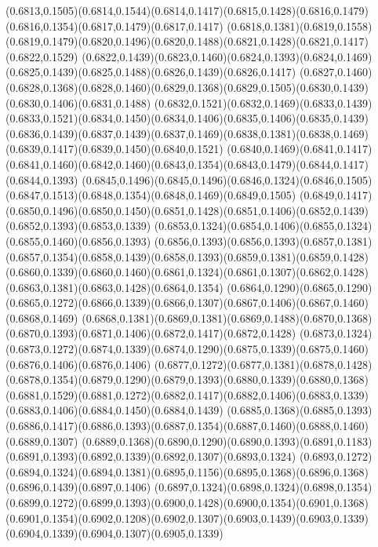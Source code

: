 (0.6813,0.1505)(0.6814,0.1544)(0.6814,0.1417)(0.6815,0.1428)(0.6816,0.1479)(0.6816,0.1354)(0.6817,0.1479)(0.6817,0.1417)
(0.6818,0.1381)(0.6819,0.1558)(0.6819,0.1479)(0.6820,0.1496)(0.6820,0.1488)(0.6821,0.1428)(0.6821,0.1417)(0.6822,0.1529)
(0.6822,0.1439)(0.6823,0.1460)(0.6824,0.1393)(0.6824,0.1469)(0.6825,0.1439)(0.6825,0.1488)(0.6826,0.1439)(0.6826,0.1417)
(0.6827,0.1460)(0.6828,0.1368)(0.6828,0.1460)(0.6829,0.1368)(0.6829,0.1505)(0.6830,0.1439)(0.6830,0.1406)(0.6831,0.1488)
(0.6832,0.1521)(0.6832,0.1469)(0.6833,0.1439)(0.6833,0.1521)(0.6834,0.1450)(0.6834,0.1406)(0.6835,0.1406)(0.6835,0.1439)
(0.6836,0.1439)(0.6837,0.1439)(0.6837,0.1469)(0.6838,0.1381)(0.6838,0.1469)(0.6839,0.1417)(0.6839,0.1450)(0.6840,0.1521)
(0.6840,0.1469)(0.6841,0.1417)(0.6841,0.1460)(0.6842,0.1460)(0.6843,0.1354)(0.6843,0.1479)(0.6844,0.1417)(0.6844,0.1393)
(0.6845,0.1496)(0.6845,0.1496)(0.6846,0.1324)(0.6846,0.1505)(0.6847,0.1513)(0.6848,0.1354)(0.6848,0.1469)(0.6849,0.1505)
(0.6849,0.1417)(0.6850,0.1496)(0.6850,0.1450)(0.6851,0.1428)(0.6851,0.1406)(0.6852,0.1439)(0.6852,0.1393)(0.6853,0.1339)
(0.6853,0.1324)(0.6854,0.1406)(0.6855,0.1324)(0.6855,0.1460)(0.6856,0.1393)
\PST@Solid(0.6856,0.1393)(0.6856,0.1393)(0.6857,0.1381)(0.6857,0.1354)(0.6858,0.1439)(0.6858,0.1393)(0.6859,0.1381)(0.6859,0.1428)
(0.6860,0.1339)(0.6860,0.1460)(0.6861,0.1324)(0.6861,0.1307)(0.6862,0.1428)(0.6863,0.1381)(0.6863,0.1428)(0.6864,0.1354)
(0.6864,0.1290)(0.6865,0.1290)(0.6865,0.1272)(0.6866,0.1339)(0.6866,0.1307)(0.6867,0.1406)(0.6867,0.1460)(0.6868,0.1469)
(0.6868,0.1381)(0.6869,0.1381)(0.6869,0.1488)(0.6870,0.1368)(0.6870,0.1393)(0.6871,0.1406)(0.6872,0.1417)(0.6872,0.1428)
(0.6873,0.1324)(0.6873,0.1272)(0.6874,0.1339)(0.6874,0.1290)(0.6875,0.1339)(0.6875,0.1460)(0.6876,0.1406)(0.6876,0.1406)
(0.6877,0.1272)(0.6877,0.1381)(0.6878,0.1428)(0.6878,0.1354)(0.6879,0.1290)(0.6879,0.1393)(0.6880,0.1339)(0.6880,0.1368)
(0.6881,0.1529)(0.6881,0.1272)(0.6882,0.1417)(0.6882,0.1406)(0.6883,0.1339)(0.6883,0.1406)(0.6884,0.1450)(0.6884,0.1439)
(0.6885,0.1368)(0.6885,0.1393)(0.6886,0.1417)(0.6886,0.1393)(0.6887,0.1354)(0.6887,0.1460)(0.6888,0.1460)(0.6889,0.1307)
(0.6889,0.1368)(0.6890,0.1290)(0.6890,0.1393)(0.6891,0.1183)(0.6891,0.1393)(0.6892,0.1339)(0.6892,0.1307)(0.6893,0.1324)
(0.6893,0.1272)(0.6894,0.1324)(0.6894,0.1381)(0.6895,0.1156)(0.6895,0.1368)(0.6896,0.1368)(0.6896,0.1439)(0.6897,0.1406)
(0.6897,0.1324)(0.6898,0.1324)(0.6898,0.1354)(0.6899,0.1272)(0.6899,0.1393)(0.6900,0.1428)(0.6900,0.1354)(0.6901,0.1368)
(0.6901,0.1354)(0.6902,0.1208)(0.6902,0.1307)(0.6903,0.1439)(0.6903,0.1339)(0.6904,0.1339)(0.6904,0.1307)(0.6905,0.1339)
